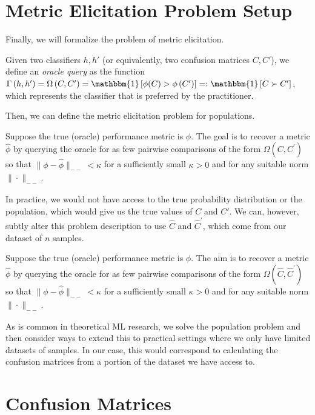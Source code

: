 \documentclass[
  letterpaper,
  DIV=11,
  numbers=noendperiod,
  oneside]{scrreprt}
\theoremstyle{remark}
\begin{document}
\section{Metric Elicitation Problem Setup}\label{sec:metric-elicitation}

Finally, we will formalize the problem of metric elicitation.

Given two classifiers \(h, h'\) (or equivalently, two confusion matrices
\(C, C'\)), we define an \emph{oracle query} as the function
\(\Gamma\left(h, h^{\prime}\right)=\Omega\left(C, C^{\prime}\right)=\mathbbm{1}\left[\phi(C)>\phi\left(C^{\prime}\right)\right]=: \mathbbm{1}\left[C \succ C^{\prime}\right]\),
which represents the classifier that is preferred by the practitioner.

Then, we can define the metric elicitation problem for populations.

Suppose the true (oracle) performance metric is \(\phi\). The goal is to
recover a metric \(\hat{\phi}\) by querying the oracle for as few
pairwise comparisons of the form \(\Omega\left(C, C^{\prime}\right)\) so
that \(\|\phi-\hat{\phi}\|_{--}<\kappa\) for a sufficiently small
\(\kappa > 0\) and for any suitable norm \(\|\cdot\|_{--}\).

In practice, we would not have access to the true probability
distribution or the population, which would give us the true values of
\(C\) and \(C'\). We can, however, subtly alter this problem description
to use \(\hat{C}\) and \(\hat{C}^{\prime}\), which come from our dataset
of \(n\) samples.

Suppose the true (oracle) performance metric is \(\phi\). The aim is to
recover a metric \(\hat{\phi}\) by querying the oracle for as few
pairwise comparisons of the form
\(\Omega\left(\hat{C}, \hat{C}^{\prime}\right)\) so that
\(\|\phi-\hat{\phi}\|_{--}<\kappa\) for a sufficiently small
\(\kappa > 0\) and for any suitable norm \(\|\cdot\|_{--}\).

As is common in theoretical ML research, we solve the population problem
and then consider ways to extend this to practical settings where we
only have limited datasets of samples. In our case, this would
correspond to calculating the confusion matrices from a portion of the
dataset we have access to.

\section{Confusion Matrices}\label{subsec:confusion-matrices}
\end{document}
